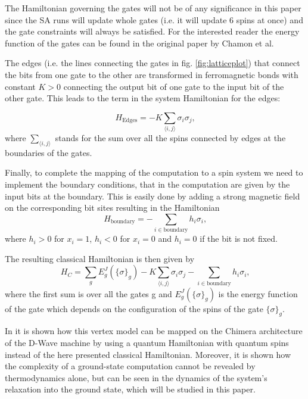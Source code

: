 The Hamiltonian governing the gates will not be of any significance in this paper since the SA runs will update whole gates (i.e. it will update 6 spins at once) and the gate constraints will always be satisfied. For the interested reader the energy function of the gates can be found in the original paper by Chamon et al.

The edges (i.e. the lines connecting the gates in fig. \ref{fig:latticeplot}) that connect the bits from one gate to the other are transformed in ferromagnetic bonds with constant $K>0$ connecting the output bit of one gate to the input bit of the other gate. This leads to the term in the system Hamiltonian for the edges:

\begin{equation}
  H_{\text{Edges}} = - K \sum_{\langle i, j \rangle} \sigma _i \sigma _j \text{,}
\end{equation}
where $\sum_ {\langle i, j \rangle}$ stands for the sum over all the spins connected by edges at the boundaries of the gates.

Finally, to complete the mapping of the computation to a spin system we need to implement the boundary conditions, that in the computation are given by the input bits at the boundary. This is easily done by adding a strong magnetic field on the corresponding bit sites resulting in the Hamiltonian
\begin{equation}
  H_{\text{boundary}}= - \sum_{i\in \text{boundary}} h_i \sigma_i \text{,}
\end{equation}
where $h_i>0$ for $x_i = 1$, $h_i<0$ for $x_i = 0$ and $h_i=0$ if the bit is not fixed.

The resulting classical Hamiltonian is then given by
\begin{equation}
  H_C = \sum_g E_g^J  \left( \{ \sigma \} _g \right) - K \sum _{\langle i, j \rangle} \sigma_i \sigma_j - \sum_{i\in \text{boundary}} h_i \sigma_i \text{,}
\end{equation}
where the first sum is over all the gates g and $E_g^J \left( \{ \sigma \} _g \right)$ is the energy function of the gate which depends on the configuration of the spins of the gate $\{ \sigma \} _g$.

In \cite{Chamon} it is shown how this vertex model can be mapped on the Chimera architecture of the D-Wave machine by using a quantum Hamiltonian with quantum spins instead of the here presented classical Hamiltonian. Moreover, it is shown how the complexity of a ground-state computation cannot be revealed by thermodynamics alone, but can be seen in the dynamics of the system's relaxation into the ground state, which will be studied in this paper.
